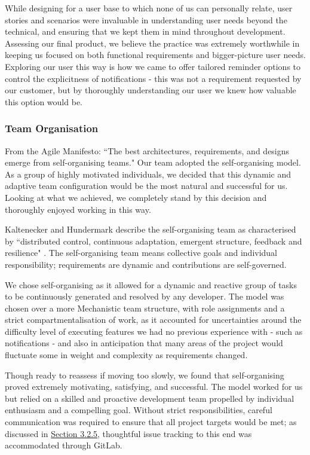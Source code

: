 \documentclass{l3proj}
\begin{document}
While designing for a user base to which none of us can personally relate, user stories and scenarios were invaluable in understanding user needs beyond the technical, and ensuring that we kept them in mind throughout development. Assessing our final product, we believe the practice was extremely worthwhile in keeping us focused on both functional requirements and bigger-picture user needs. Exploring our user this way is how we came to offer tailored reminder options to control the explicitness of notifications - this was not a requirement requested by our customer, but by thoroughly understanding our user we knew how valuable this option would be.


\subsubsection{Team Organisation} \label{sec:3.2.2}
From the Agile Manifesto: ``The best architectures, requirements, and designs emerge from self-organising teams." \cite{AgileManifesto} Our team adopted the self-organising model. As a group of highly motivated individuals, we decided that this dynamic and adaptive team configuration would be the most natural and successful for us. Looking at what we achieved, we completely stand by this decision and thoroughly enjoyed working in this way. 

Kaltenecker and Hundermark describe the self-organising team as characterised by ``distributed control, continuous adaptation, emergent structure, feedback and resilience" \cite{SOTeams}. The self-organising team means collective goals and individual responsibility; requirements are dynamic and contributions are self-governed. 

We chose self-organising as it allowed for a dynamic and reactive group of tasks to be continuously generated and resolved by any developer. The model was chosen over a more Mechanistic \cite{mechanistic} team structure, with role assignments and a strict compartmentalisation of work, as it accounted for uncertainties around the difficulty level of executing features we had no previous experience with - such as notifications - and also in anticipation that many areas of the project would fluctuate some in weight and complexity as requirements changed.

Though ready to reassess if moving too slowly, we found that self-organising proved extremely motivating, satisfying, and successful. The model worked for us but relied on a skilled and proactive development team propelled by individual enthusiasm and a compelling goal. Without strict responsibilities, careful communication was required to ensure that all project targets would be met; as discussed in \hyperref[sec:3.2.5]{Section 3.2.5}, thoughtful issue tracking to this end was accommodated through GitLab. 
\end{document}
